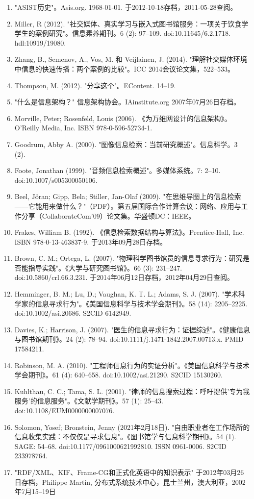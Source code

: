 \begin{enumerate}
\item "ASIST历史"。Asis.org. 1968-01-01. 于2012-10-18存档，2011-05-28查阅。  
\item Miller, R (2012). "社交媒体、真实学习与嵌入式图书馆服务：一项关于饮食学学生的案例研究"。信息素养期刊。6 (2): 97–109. doi:10.11645/6.2.1718. hdl:10919/19080.  
\item Zhang, B., Semenov, A., Vos, M. 和 Veijlainen, J. (2014). "理解社交媒体环境中信息的快速传播：两个案例的比较"。ICC 2014会议论文集，522–533。  
\item Thompson, M. (2012). "分享这个"。EContent. 14–19.  
\item "什么是信息架构？" 信息架构协会。IAinstitute.org 2007年07月26日存档。  
\item Morville, Peter; Rosenfeld, Louis (2006). 《为万维网设计的信息架构》。O'Reilly Media, Inc. ISBN 978-0-596-52734-1.  
\item Goodrum, Abby A. (2000). "图像信息检索：当前研究概述"。信息科学。3 (2).  
\item Foote, Jonathan (1999). "音频信息检索概述"。多媒体系统。7: 2–10. doi:10.1007/s005300050106.  
\item Beel, Jöran; Gipp, Bela; Stiller, Jan-Olaf (2009). "在思维导图上的信息检索——它能用来做什么？"（PDF）。第五届国际合作计算会议：网络、应用与工作分享（CollaborateCom'09）论文集。华盛顿DC：IEEE。  
\item Frakes, William B. (1992). 《信息检索数据结构与算法》。Prentice-Hall, Inc. ISBN 978-0-13-463837-9. 于2013年09月28日存档。  
\item Brown, C. M.; Ortega, L. (2007). "物理科学图书馆员的信息寻求行为：研究是否能指导实践"。《大学与研究图书馆》。66 (3): 231–247. doi:10.5860/crl.66.3.231. 于2014年06月12日存档，2012年04月29日查阅。  
\item Hemminger, B. M.; Lu, D.; Vaughan, K. T. L.; Adams, S. J. (2007). "学术科学家的信息寻求行为"。《美国信息科学与技术学会期刊》。58 (14): 2205–2225. doi:10.1002/asi.20686. S2CID 6142949.  
\item Davies, K.; Harrison, J. (2007). "医生的信息寻求行为：证据综述"。《健康信息与图书馆期刊》。24 (2): 78–94. doi:10.1111/j.1471-1842.2007.00713.x. PMID 17584211.  
\item Robinson, M. A. (2010). "工程师信息行为的实证分析"。《美国信息科学与技术学会期刊》。61 (4): 640–658. doi:10.1002/asi.21290. S2CID 15130260.  
\item Kuhlthau, C. C.; Tama, S. L. (2001). "律师的信息搜索过程：呼吁提供'专为我服务'的信息服务"。《文献学期刊》。57 (1): 25–43. doi:10.1108/EUM0000000007076.  
\item Solomon, Yosef; Bronstein, Jenny (2021年2月18日). "自由职业者在工作场所的信息收集实践：不仅仅是寻求信息"。《图书馆学与信息科学期刊》。54 (1). SAGE: 54–68. doi:10.1177/0961000621992810. ISSN 0961-0006. S2CID 233978764.  
\item "RDF/XML、KIF、Frame-CG和正式化英语中的知识表示" 于2012年03月26日存档，Philippe Martin, 分布式系统技术中心，昆士兰州，澳大利亚，2002年7月15–19日
\end{enumerate}

